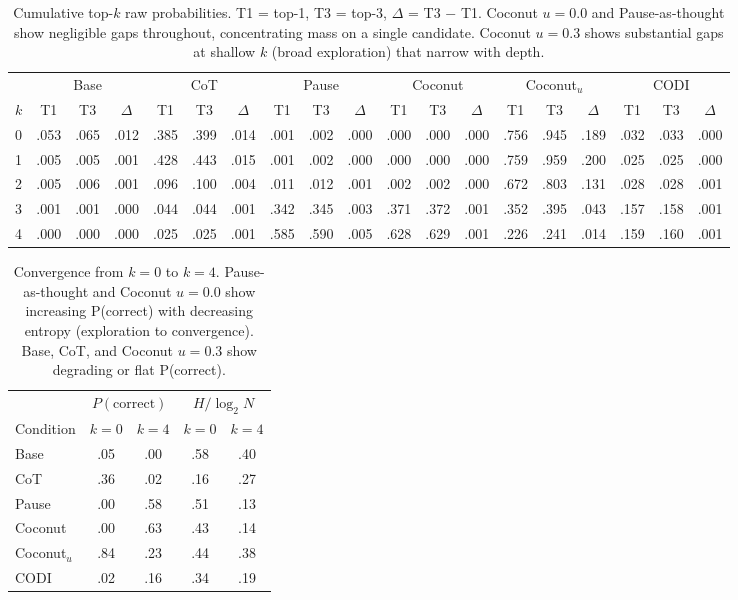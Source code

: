 \begin{table}[h!]
\centering
\small
\setlength{\tabcolsep}{4pt}
\caption{Cumulative top-$k$ raw probabilities. T1 = top-1, T3 = top-3, $\Delta$ = T3 $-$ T1. Coconut $u{=}0.0$ and Pause-as-thought show negligible gaps throughout, concentrating mass on a single candidate. Coconut $u{=}0.3$ shows substantial gaps at shallow $k$ (broad exploration) that narrow with depth.}
\begin{tabular}{l ccc ccc ccc ccc ccc ccc}
\toprule
 & \multicolumn{3}{c}{Base} & \multicolumn{3}{c}{CoT} & \multicolumn{3}{c}{Pause} & \multicolumn{3}{c}{Coconut} & \multicolumn{3}{c}{Coconut$_{u}$} & \multicolumn{3}{c}{CODI} \\
\cmidrule(lr){2-4} \cmidrule(lr){5-7} \cmidrule(lr){8-10} \cmidrule(lr){11-13} \cmidrule(lr){14-16} \cmidrule(lr){17-19}
$k$ & T1 & T3 & $\Delta$ & T1 & T3 & $\Delta$ & T1 & T3 & $\Delta$ & T1 & T3 & $\Delta$ & T1 & T3 & $\Delta$ & T1 & T3 & $\Delta$ \\
\midrule
0 & .053 & .065 & .012 & .385 & .399 & .014 & .001 & .002 & .000 & .000 & .000 & .000 & .756 & .945 & .189 & .032 & .033 & .000 \\
1 & .005 & .005 & .001 & .428 & .443 & .015 & .001 & .002 & .000 & .000 & .000 & .000 & .759 & .959 & .200 & .025 & .025 & .000 \\
2 & .005 & .006 & .001 & .096 & .100 & .004 & .011 & .012 & .001 & .002 & .002 & .000 & .672 & .803 & .131 & .028 & .028 & .001 \\
3 & .001 & .001 & .000 & .044 & .044 & .001 & .342 & .345 & .003 & .371 & .372 & .001 & .352 & .395 & .043 & .157 & .158 & .001 \\
4 & .000 & .000 & .000 & .025 & .025 & .001 & .585 & .590 & .005 & .628 & .629 & .001 & .226 & .241 & .014 & .159 & .160 & .001 \\
\bottomrule
\end{tabular}
\label{tab:candidate_parallelism}
\end{table}


\begin{table}[h!]
\centering
\small
\caption{Convergence from $k{=}0$ to $k{=}4$. Pause-as-thought and Coconut $u{=}0.0$ show increasing P(correct) with decreasing entropy (exploration to convergence). Base, CoT, and Coconut $u{=}0.3$ show degrading or flat P(correct).}
\begin{tabular}{l cc cc}
\toprule
& \multicolumn{2}{c}{$P(\text{correct})$} & \multicolumn{2}{c}{$H/\log_2 N$} \\
\cmidrule(lr){2-3} \cmidrule(lr){4-5}
Condition & $k{=}0$ & $k{=}4$ & $k{=}0$ & $k{=}4$ \\
\midrule
Base & .05 & .00 & .58 & .40 \\
CoT & .36 & .02 & .16 & .27 \\
Pause & .00 & .58 & .51 & .13 \\
Coconut & .00 & .63 & .43 & .14 \\
Coconut$_{u}$ & .84 & .23 & .44 & .38 \\
CODI & .02 & .16 & .34 & .19 \\
\bottomrule
\end{tabular}
\label{tab:convergence_trajectories}
\end{table}


